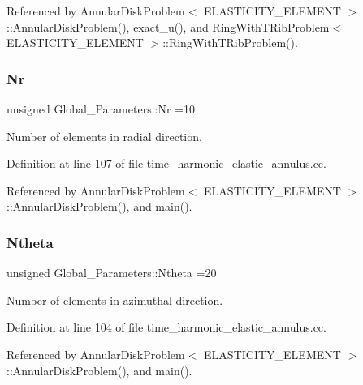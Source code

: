 Referenced by Annular\+Disk\+Problem$<$ E\+L\+A\+S\+T\+I\+C\+I\+T\+Y\+\_\+\+E\+L\+E\+M\+E\+N\+T $>$\+::\+Annular\+Disk\+Problem(), exact\+\_\+u(), and Ring\+With\+T\+Rib\+Problem$<$ E\+L\+A\+S\+T\+I\+C\+I\+T\+Y\+\_\+\+E\+L\+E\+M\+E\+N\+T $>$\+::\+Ring\+With\+T\+Rib\+Problem().

\mbox{\label{namespaceGlobal__Parameters_aeebb1e39d849d32cebdc9be13026606e}} 
\subsubsection{\texorpdfstring{Nr}{Nr}}
{\footnotesize\ttfamily unsigned Global\+\_\+\+Parameters\+::\+Nr =10}



Number of elements in radial direction. 



Definition at line 107 of file time\+\_\+harmonic\+\_\+elastic\+\_\+annulus.\+cc.



Referenced by Annular\+Disk\+Problem$<$ E\+L\+A\+S\+T\+I\+C\+I\+T\+Y\+\_\+\+E\+L\+E\+M\+E\+N\+T $>$\+::\+Annular\+Disk\+Problem(), and main().

\mbox{\label{namespaceGlobal__Parameters_a1f67286edeb13ef67687fd483e105b5e}} 
\subsubsection{\texorpdfstring{Ntheta}{Ntheta}}
{\footnotesize\ttfamily unsigned Global\+\_\+\+Parameters\+::\+Ntheta =20}



Number of elements in azimuthal direction. 



Definition at line 104 of file time\+\_\+harmonic\+\_\+elastic\+\_\+annulus.\+cc.



Referenced by Annular\+Disk\+Problem$<$ E\+L\+A\+S\+T\+I\+C\+I\+T\+Y\+\_\+\+E\+L\+E\+M\+E\+N\+T $>$\+::\+Annular\+Disk\+Problem(), and main().

\mbox{\label{namespaceGlobal__Parameters_a20fccdcfa2c15ad8b951b9ada3bb1661}} 
